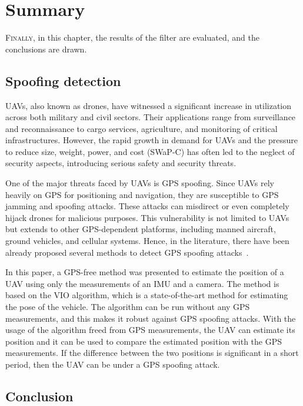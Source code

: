 \chapter{Summary}\label{chap:conclusion}

\lettrine{F}{inally}, in this chapter, the results of the filter are evaluated, and the conclusions are drawn.

\section{Spoofing detection}

UAVs, also known as drones, have witnessed a significant increase in utilization across both military and civil sectors. Their applications range from surveillance and reconnaissance to cargo services, agriculture, and monitoring of critical infrastructures. However, the rapid growth in demand for UAVs and the pressure to reduce size, weight, power, and cost (SWaP-C) has often led to the neglect of security aspects, introducing serious safety and security threats.

One of the major threats faced by UAVs is GPS spoofing. Since UAVs rely heavily on GPS for positioning and navigation, they are susceptible to GPS jamming and spoofing attacks. These attacks can misdirect or even completely hijack drones for malicious purposes. This vulnerability is not limited to UAVs but extends to other GPS-dependent platforms, including manned aircraft, ground vehicles, and cellular systems. Hence, in the literature, there have been already proposed several methods to detect GPS spoofing attacks~\cite{spoofing-1, spoofing-2}.

In this paper, a GPS-free method was presented to estimate the position of a UAV using only the measurements of an IMU and a camera. The method is based on the VIO algorithm, which is a state-of-the-art method for estimating the pose of the vehicle. The algorithm can be run without any GPS measurements, and this makes it robust against GPS spoofing attacks. With the usage of the algorithm freed from GPS measurements, the UAV can estimate its position and it can be used to compare the estimated position with the GPS measurements. If the difference between the two positions is significant in a short period, then the UAV can be under a GPS spoofing attack.

\section{Conclusion}

